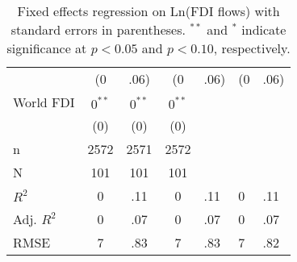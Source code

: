 \begin{table}[ht]
\begin{tabular}{lccc}
   & (0&.06) & (0&.06) & (0&.06) \\ 
  World FDI & $0^{\ast\ast}$ & $0^{\ast\ast}$ & $0^{\ast\ast}$ \\ 
   & (0) & (0) & (0) \\ 
   \hline
n & 2572 & 2571 & 2572 \\ 
  N & 101 & 101 & 101 \\ 
  $R^{2}$ & 0&.11 & 0&.11 & 0&.11 \\ 
  Adj. $R^{2}$ & 0&.07 & 0&.07 & 0&.07 \\ 
  RMSE & 7&.83 & 7&.83 & 7&.82 \\ 
   \hline
\hline
\end{tabular}
\endgroup
\caption{Fixed effects regression on Ln(FDI flows) with standard errors in parentheses. $^{**}$ and $^{*}$ indicate significance at $p< 0.05 $ and $p< 0.10 $, respectively.} 
\end{table}
